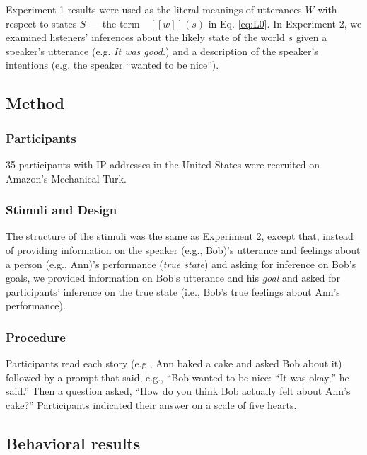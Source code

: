 \documentclass[10pt,letterpaper]{article}
\newcommand{\denote}[1]{\mbox{ $[\![ #1 ]\!]$}}
\newcommand{\ndg}[1]{\textcolor{Green}{[ndg: #1]}}
\begin{document}
Experiment 1 results were used as the literal meanings of utterances $W$ with respect to states $S$ --- the term $\denote{w}(s)$ in Eq. \ref{eq:L0}.
In Experiment 2, we examined listeners' inferences about the likely state of the world $s$ given a speaker's utterance (e.g. \emph{It was good.}) and a description of the speaker's intentions (e.g. the speaker ``wanted to be nice'').

\subsection{Method}

\subsubsection{Participants}

35 participants with IP addresses in the United States were recruited on Amazon's Mechanical Turk. 

\subsubsection{Stimuli and Design}

The structure of the stimuli was the same as Experiment 2, except that, instead of providing information on the speaker (e.g., Bob)'s utterance and feelings about a person (e.g., Ann)'s performance (\emph{true state}) and asking for inference on Bob's goals, we provided information on Bob's utterance and his \emph{goal} and asked for participants' inference on the true state (i.e., Bob's true feelings about Ann's performance).

\subsubsection{Procedure}
Participants read each story (e.g., Ann baked a cake and asked Bob about it) followed by a prompt that said, 
e.g., ``Bob wanted to be nice: ``It was okay,'' he said.''
Then a question asked, ``How do you think Bob actually felt about Ann's cake?''
Participants indicated their answer on a scale of five hearts.

\subsection{Behavioral results}

\end{document}
